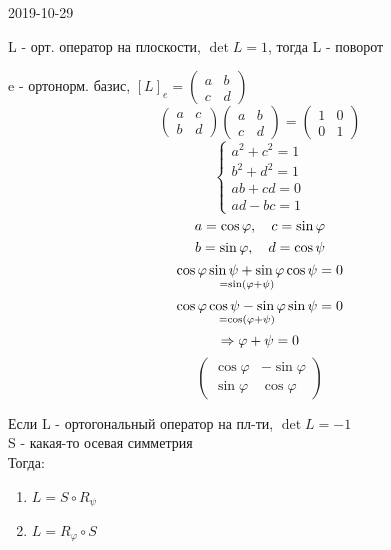 \documentclass[main]{subfiles}
\begin{document}
  \begin{lect}{2019-10-29}
    \begin{definition}
      L - орт. оператор на плоскости, $\det L = 1$, тогда L - поворот
    \end{definition}

    e - ортонорм. базис, $[L]_e = \begin{pmatrix}
      a & b\\
      c & d
    \end{pmatrix}$
    \[\begin{pmatrix}
      a & c\\
      b & d
    \end{pmatrix} \begin{pmatrix}
      a & b\\
      c & d
    \end{pmatrix} = \begin{pmatrix}
      1 & 0\\
      0 & 1
    \end{pmatrix}\]
    \[\begin{cases}
      a^2 + c^2 = 1\\
      b^2 + d^2 = 1\\
      ab + cd = 0\\
      ad - bc = 1
    \end{cases}\]
    \[a = \cos \varphi,\quad c = \sin \varphi\]
    \[b = \sin \varphi,\quad d = \cos \psi\]
    \[\underset{= \sin(\varphi + \psi)}{\cos \varphi \sin \psi + \sin \varphi \cos \psi} = 0\]
    \[\underset{= \cos(\varphi + \psi)}{\cos \varphi \cos \psi - \sin \varphi \sin \psi} = 0\]
    \[\Rightarrow \varphi + \psi = 0\]
    \[\begin{pmatrix}
      \cos \varphi & - \sin \varphi\\
      \sin \varphi & \cos \varphi
    \end{pmatrix}\]

    \begin{definition}
      Если L - ортогональный оператор на пл-ти, $\det L = -1$\\
      S - какая-то осевая симметрия\\
      Тогда:
      \begin{enumerate}
        \item $L = S \circ R_{\psi}$
        \item $L = R_{\varphi} \circ S$
      \end{enumerate}
    \end{definition}


\end{lect}
\end{document}
